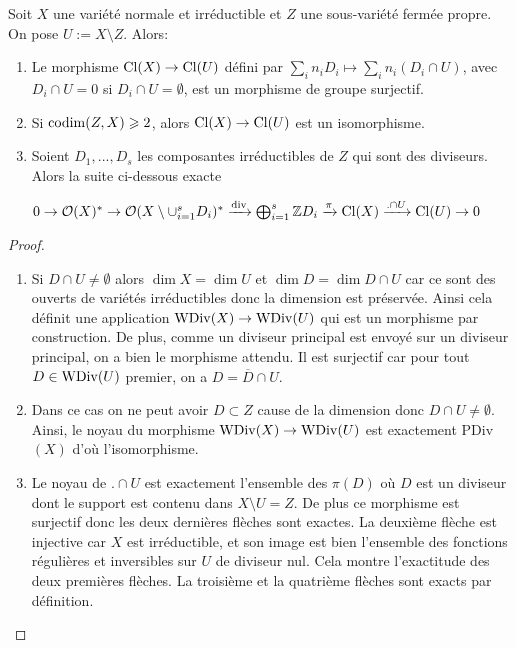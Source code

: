 \begin{thm}\label{divexactseq}
Soit $X$ une variété normale et irréductible et $Z$ une sous-variété fermée propre. On pose $U:=X\setminus Z$. Alors:
\begin{enumerate}
\item Le morphisme $\operatorname{Cl}(X)\rightarrow\operatorname{Cl}(U)$ défini par $\sum_i n_iD_i\mapsto \sum_i n_i(D_i\cap U)$, avec $D_i\cap U = 0$ si $D_i\cap U=\emptyset $, est un morphisme de groupe surjectif.
\item Si $\operatorname{codim}(Z,X)\geqslant 2$, alors $\operatorname{Cl}(X)\rightarrow \operatorname{Cl}(U)$ est un isomorphisme.
\item Soient $D_1,..., D_s$ les composantes irréductibles de $Z$ qui sont des diviseurs. Alors la suite ci-dessous exacte
\begin{center}
 $0\rightarrow\mathcal{O}(X)^*\rightarrow \mathcal{O}(X\setminus \cup_{i=1}^s D_i)^*\xrightarrow{\operatorname{div}} \bigoplus_{i=1}^s \mathbb{Z} D_i \xrightarrow{\pi} \operatorname{Cl}(X) \xrightarrow{.\cap U} \operatorname{Cl}(U) \rightarrow 0 $
\end{center}

\end{enumerate}
\end{thm}
\begin{proof}
\begin{enumerate}
\item Si $D\cap U\neq \emptyset$ alors $\dim X=\dim U$ et $\dim D=\dim D\cap U$ car ce sont des ouverts de variétés irréductibles donc la dimension est préservée. Ainsi cela définit une application $\operatorname{WDiv}(X)\rightarrow \operatorname{WDiv}(U)$ qui est un morphisme par construction. De plus, comme un diviseur principal est envoyé sur un diviseur principal, on a bien le morphisme attendu. Il est surjectif car pour tout $D\in\operatorname{WDiv}(U)$ premier, on a $D=\overline{D}\cap U$.
\item Dans ce cas on ne peut avoir $D\subset Z$ cause de la dimension donc $D\cap U\neq \emptyset$. Ainsi, le noyau du morphisme $\operatorname{WDiv}(X)\rightarrow \operatorname{WDiv}(U)$ est exactement PDiv$(X)$ d'où l'isomorphisme.
\item Le noyau de $.\cap U$ est exactement l'ensemble des $\pi(D)$ où $D$ est un diviseur dont le support est contenu dans $X\setminus U=Z$. De plus ce morphisme est surjectif donc les deux dernières flèches sont exactes. La deuxième flèche est injective car $X$ est irréductible, et son image est bien l'ensemble des fonctions régulières et inversibles sur $U$ de diviseur nul. Cela montre l'exactitude des deux premières flèches. La troisième et la quatrième flèches sont exacts par définition.
\end{enumerate}
\end{proof}

